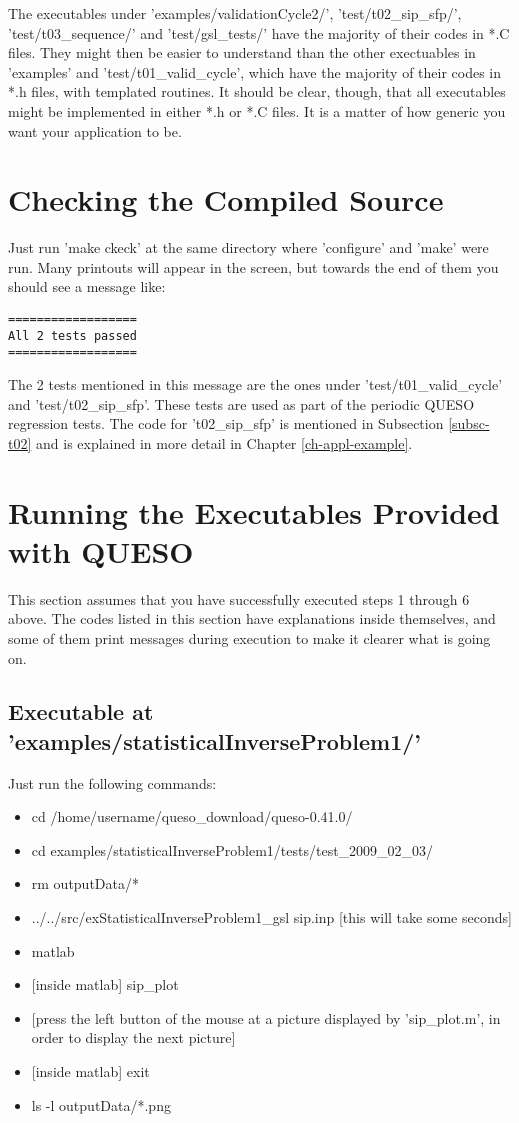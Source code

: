 The executables under 'examples/validationCycle2/', 'test/t02\_sip\_sfp/', 'test/t03\_sequence/' and 'test/gsl\_tests/'
have the majority of their codes in *.C files.
They might then be easier to understand than
the other exectuables in 'examples' and 'test/t01\_valid\_cycle', which
have the majority of their codes in *.h files, with templated routines.
It should be clear, though, that all executables might be implemented in either *.h or *.C files.
It is a matter of how generic you want your application to be.

\section{Checking the Compiled Source} \label{sc-checks}

Just run 'make ckeck' at the same directory where 'configure' and 'make' were run.
Many printouts will appear in the screen, but towards the end of them you should see
a message like:
\begin{verbatim}
==================
All 2 tests passed
==================
\end{verbatim}

The 2 tests mentioned in this message are the ones under 'test/t01\_valid\_cycle' and
'test/t02\_sip\_sfp'. These tests are used as part of the periodic QUESO regression tests.
The code for 't02\_sip\_sfp' is mentioned in Subsection \ref{subsc-t02} and is explained in more detail in Chapter \ref{ch-appl-example}.

\section{Running the Executables Provided with QUESO} \label{sc-running-execs}

This section assumes that you have successfully executed steps 1 through 6 above.
The codes listed in this section have explanations inside themselves, and some of them
print messages during execution to make it clearer what is going on.

\subsection{Executable at 'examples/statisticalInverseProblem1/'}

Just run the following commands:
\begin{itemize}
\item cd /home/username/queso\_download/queso-0.41.0/
\item cd examples/statisticalInverseProblem1/tests/test\_2009\_02\_03/
\item rm outputData/*
\item ../../src/exStatisticalInverseProblem1\_gsl sip.inp [this will take some seconds]
\item matlab
\item {[inside matlab]} sip\_plot
\item {[press the left button of the mouse at a picture displayed by 'sip\_plot.m', in order to display the next picture]}
\item {[inside matlab]} exit
\item ls -l outputData/*.png
\end{itemize}

